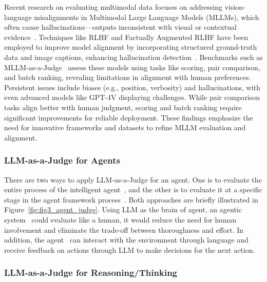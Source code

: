 \documentclass[acmsmall,screen]{acmart}
\begin{document}
Recent research on evaluating multimodal data focuses on addressing vision-language misalignments in Multimodal Large Language Models (MLLMs), which often cause hallucinations—outputs inconsistent with visual or contextual evidence~\citep{li2023evaluating, wang2023evaluation, cui2023holistic}. Techniques like RLHF and Factually Augmented RLHF have been employed to improve model alignment by incorporating structured ground-truth data and image captions, enhancing hallucination detection~\citep{llava_rlhf}. Benchmarks such as MLLM-as-a-Judge~\citep{mllm-as-a-judge} assess these models using tasks like scoring, pair comparison, and batch ranking, revealing limitations in alignment with human preferences. Persistent issues include biases (e.g., position, verbosity) and hallucinations, with even advanced models like GPT-4V displaying challenges. While pair comparison tasks align better with human judgment, scoring and batch ranking require significant improvements for reliable deployment. These findings emphasize the need for innovative frameworks and datasets to refine MLLM evaluation and alignment.







\subsubsection{\textbf{LLM-as-a-Judge for Agents}} 



There are two ways to apply LLM-as-a-Judge for an agent. One is to evaluate the entire process of the intelligent agent~\citep{aaaj}, and the other is to evaluate it at a specific stage in the agent framework process~\citep{hao2023reasoning,nips_reflexion}. Both approaches are briefly illustrated in Figure~\ref{fig:fig3_agent_judge}.
Using LLM as the brain of agent, an agentic system~\citep{aaaj} could evaluate like a human, it would reduce the need for human involvement and eliminate the trade-off between thoroughness and effort. In addition, the agent~\citep{nips_reflexion} can interact with the environment through language and receive feedback on actions through LLM to make decisions for the next action.


\subsubsection{\textbf{LLM-as-a-Judge for Reasoning/Thinking}} 
\end{document}
